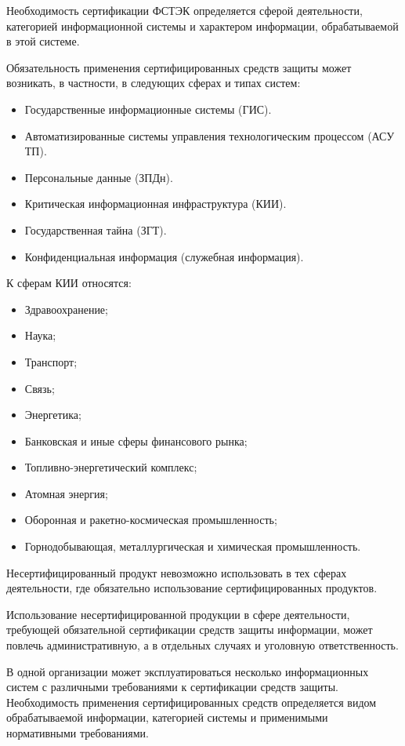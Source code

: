 Необходимость сертификации ФСТЭК определяется сферой деятельности, категорией информационной системы и характером информации, обрабатываемой в этой системе.

Обязательность применения сертифицированных средств защиты может возникать, в частности, в следующих сферах и типах систем:
\begin{itemize}
    \item Государственные информационные системы (ГИС).
    \item Автоматизированные системы управления технологическим процессом (АСУ ТП).
    \item Персональные данные (ЗПДн).
    \item Критическая информационная инфраструктура (КИИ).
    \item Государственная тайна (ЗГТ).
    \item Конфиденциальная информация (служебная информация).
\end{itemize}

К сферам КИИ относятся:
\begin{itemize}
    \item Здравоохранение;
    \item Наука;
    \item Транспорт;
    \item Связь;
    \item Энергетика;
    \item Банковская и иные сферы финансового рынка;
    \item Топливно-энергетический комплекс;
    \item Атомная энергия;
    \item Оборонная и ракетно-космическая промышленность;
    \item Горнодобывающая, металлургическая и химическая промышленность.
\end{itemize}

Несертифицированный продукт невозможно использовать в тех сферах деятельности, где обязательно использование сертифицированных продуктов.

Использование несертифицированной продукции в сфере деятельности, требующей обязательной сертификации средств защиты информации, может повлечь административную, а в отдельных случаях и уголовную ответственность.

В одной организации может эксплуатироваться несколько информационных систем с различными требованиями к сертификации средств защиты. Необходимость применения сертифицированных средств определяется видом обрабатываемой информации, категорией системы и применимыми нормативными требованиями.

